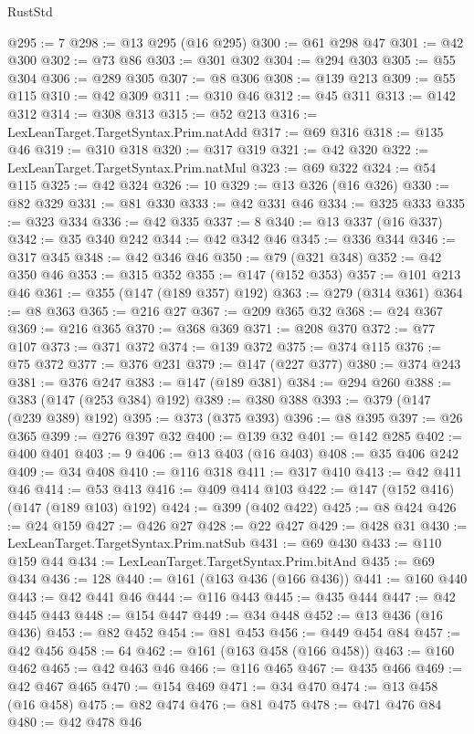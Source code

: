 \begin{lexlean}{RustStd}
\begin{coremodule}
@295 := 7
@298 := @13 @295 (@16 @295)
@300 := @61 @298 @47
@301 := @42 @300
@302 := @73 @86
@303 := @301 @302
@304 := @294 @303
@305 := @55 @304
@306 := @289 @305
@307 := @8 @306
@308 := @139 @213
@309 := @55 @115
@310 := @42 @309
@311 := @310 @46
@312 := @45 @311
@313 := @142 @312
@314 := @308 @313
@315 := @52 @213
@316 := LexLeanTarget.TargetSyntax.Prim.natAdd
@317 := @69 @316
@318 := @135 @46
@319 := @310 @318
@320 := @317 @319
@321 := @42 @320
@322 := LexLeanTarget.TargetSyntax.Prim.natMul
@323 := @69 @322
@324 := @54 @115
@325 := @42 @324
@326 := 10
@329 := @13 @326 (@16 @326)
@330 := @82 @329
@331 := @81 @330
@333 := @42 @331 @46
@334 := @325 @333
@335 := @323 @334
@336 := @42 @335
@337 := 8
@340 := @13 @337 (@16 @337)
@342 := @35 @340 @242
@344 := @42 @342 @46
@345 := @336 @344
@346 := @317 @345
@348 := @42 @346 @46
@350 := @79 (@321 @348)
@352 := @42 @350 @46
@353 := @315 @352
@355 := @147 (@152 @353)
@357 := @101 @213 @46
@361 := @355 (@147 (@189 @357) @192)
@363 := @279 (@314 @361)
@364 := @8 @363
@365 := @216 @27
@367 := @209 @365 @32
@368 := @24 @367
@369 := @216 @365
@370 := @368 @369
@371 := @208 @370
@372 := @77 @107
@373 := @371 @372
@374 := @139 @372
@375 := @374 @115
@376 := @75 @372
@377 := @376 @231
@379 := @147 (@227 @377)
@380 := @374 @243
@381 := @376 @247
@383 := @147 (@189 @381)
@384 := @294 @260
@388 := @383 (@147 (@253 @384) @192)
@389 := @380 @388
@393 := @379 (@147 (@239 @389) @192)
@395 := @373 (@375 @393)
@396 := @8 @395
@397 := @26 @365
@399 := @276 @397 @32
@400 := @139 @32
@401 := @142 @285
@402 := @400 @401
@403 := 9
@406 := @13 @403 (@16 @403)
@408 := @35 @406 @242
@409 := @34 @408
@410 := @116 @318
@411 := @317 @410
@413 := @42 @411 @46
@414 := @53 @413
@416 := @409 @414 @103
@422 := @147 (@152 @416) (@147 (@189 @103) @192)
@424 := @399 (@402 @422)
@425 := @8 @424
@426 := @24 @159
@427 := @426 @27
@428 := @22 @427
@429 := @428 @31
@430 := LexLeanTarget.TargetSyntax.Prim.natSub
@431 := @69 @430
@433 := @110 @159 @44
@434 := LexLeanTarget.TargetSyntax.Prim.bitAnd
@435 := @69 @434
@436 := 128
@440 := @161 (@163 @436 (@166 @436))
@441 := @160 @440
@443 := @42 @441 @46
@444 := @116 @443
@445 := @435 @444
@447 := @42 @445 @443
@448 := @154 @447
@449 := @34 @448
@452 := @13 @436 (@16 @436)
@453 := @82 @452
@454 := @81 @453
@456 := @449 @454 @84
@457 := @42 @456
@458 := 64
@462 := @161 (@163 @458 (@166 @458))
@463 := @160 @462
@465 := @42 @463 @46
@466 := @116 @465
@467 := @435 @466
@469 := @42 @467 @465
@470 := @154 @469
@471 := @34 @470
@474 := @13 @458 (@16 @458)
@475 := @82 @474
@476 := @81 @475
@478 := @471 @476 @84
@480 := @42 @478 @46

\end{coremodule}
\end{lexlean}
